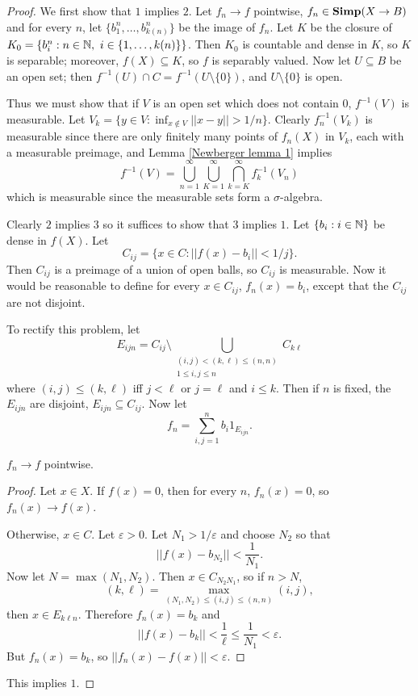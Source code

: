 \begin{proof}
We first show that $1$ implies $2$.
Let $f_n \to f$ pointwise, $f_n \in \mathbf{Simp}(X \to B)$ and for every $n$, let $\{b_1^n, \dots, b_{k(n)}^n\}$ be the image of $f_n$.
Let $K$ be the closure of $K_0 = \{b_i^n: n \in \mathbb{N},~i \in \{1, \dots, k(n)\}\}$.
Then $K_0$ is countable and dense in $K$, so $K$ is separable; moreover, $f(X) \subseteq K$, so $f$ is separably valued.
Now let $U \subseteq B$ be an open set; then $f^{-1}(U) \cap C = f^{-1}(U \setminus \{0\})$, and $U \setminus \{0\}$ is open.

Thus we must show that if $V$ is an open set which does not contain $0$, $f^{-1}(V)$ is measurable. Let $V_k = \{y \in V: \inf_{x \notin V} ||x - y|| > 1/n\}$. Clearly $f_n^{-1}(V_k)$ is measurable since there are only finitely many points of $f_n(X)$ in $V_k$, each with a measurable preimage, and Lemma \ref{Newberger lemma 1} implies
$$f^{-1}(V) = \bigcup_{n=1}^\infty \bigcup_{K=1}^\infty \bigcap_{k=K}^\infty f_k^{-1}(V_n)$$
which is measurable since the measurable sets form a $\sigma$-algebra.

Clearly $2$ implies $3$ so it suffices to show that $3$ implies $1$.
Let $\{b_i: i \in \mathbb{N}\}$ be dense in $f(X)$.
Let
$$C_{ij} = \{x \in C: ||f(x) - b_i|| < 1/j\}.$$
Then $C_{ij}$ is a preimage of a union of open balls, so $C_{ij}$ is measurable.
Now it would be reasonable to define for every $x \in C_{ij}$, $f_n(x) = b_i$, except that the $C_{ij}$ are not disjoint.

To rectify this problem, let
$$E_{ijn} = C_{ij} \setminus \bigcup_{\substack{(i,j) < (k, \ell) \leq (n, n)\\1 \leq i,j \leq n}} C_{k\ell}$$
where $(i, j) \leq (k, \ell)$ iff $j < \ell$ or $j = \ell$ and $i \leq k$.
Then if $n$ is fixed, the $E_{ijn}$ are disjoint, $E_{ijn} \subseteq C_{ij}$.
Now let
$$f_n = \sum_{i,j=1}^n b_i 1_{E_{ijn}}.$$
\begin{sublemma}
$f_n \to f$ pointwise.
\end{sublemma}
\begin{proof}
Let $x \in X$. If $f(x) = 0$, then for every $n$, $f_n(x) = 0$, so $f_n(x) \to f(x)$.

Otherwise, $x \in C$. Let $\varepsilon > 0$. Let $N_1 > 1/\varepsilon$ and choose $N_2$ so that
$$||f(x) - b_{N_2}|| < \frac{1}{N_1}.$$
Now let $N = \max(N_1, N_2)$. Then $x \in C_{N_2N_1}$, so if $n > N$,
$$(k, \ell) = \max_{(N_1, N_2) \leq (i, j) \leq (n, n)} (i,j),$$
then $x \in E_{k\ell n}$. Therefore $f_n(x) = b_k$ and
$$||f(x) - b_k|| < \frac{1}{\ell} \leq \frac{1}{N_1} < \varepsilon.$$
But $f_n(x) = b_k$, so $||f_n(x) - f(x)|| < \varepsilon$.
\end{proof}
This implies $1$.
\end{proof}

